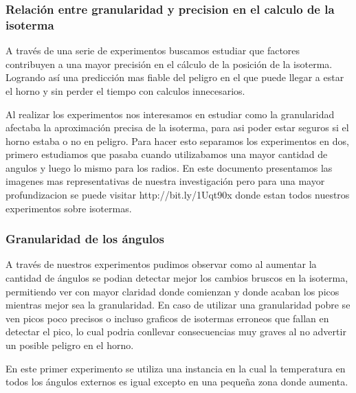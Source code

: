 \subsubsection{Relación entre granularidad y precision en el calculo de la isoterma}

A través de una serie de experimentos buscamos estudiar que factores contribuyen a una mayor precisión en el cálculo de la posición de la isoterma. Logrando así una predicción mas fiable del peligro en el que puede llegar a estar el horno y sin perder el tiempo con calculos innecesarios.


Al realizar los experimentos nos interesamos en estudiar como la granularidad afectaba la aproximación precisa de la isoterma, para asi poder estar seguros si el horno estaba o no en peligro. Para hacer esto separamos los experimentos en dos, primero estudiamos que pasaba cuando utilizabamos una mayor cantidad de angulos y luego lo mismo para los radios. En este documento presentamos las imagenes mas representativas de nuestra investigación pero para una mayor profundizacion se puede visitar http://bit.ly/1Uqt90x donde estan todos nuestros experimentos sobre isotermas.

\subsubsection{Granularidad de los ángulos}

A través de nuestros experimentos pudimos observar como al aumentar la cantidad de ángulos se podian detectar mejor los cambios bruscos en la isoterma, permitiendo ver con mayor claridad donde comienzan y donde acaban los picos mientras mejor sea la granularidad. En caso de utilizar una granularidad pobre se ven picos poco precisos o incluso graficos de isotermas erroneos que fallan en detectar el pico, lo cual podria conllevar consecuencias muy graves al no advertir un posible peligro en el horno.

En este primer experimento se utiliza una instancia en la cual la temperatura en todos los ángulos externos es igual excepto en una pequeña zona donde aumenta.

